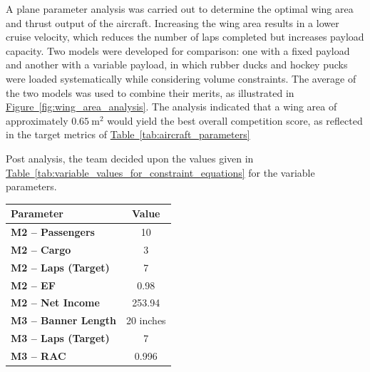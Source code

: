 \documentclass[10pt, letterpaper]{article}
\begin{document}
\noindent
\begin{minipage}{0.6\textwidth}
A plane parameter analysis was carried out to determine the optimal wing area and thrust
output of the aircraft. Increasing the wing area results in a lower cruise velocity, which
reduces the number of laps completed but increases payload capacity. Two models were
developed for comparison: one with a fixed payload and another with a variable payload,
in which rubber ducks and hockey pucks were loaded systematically while considering volume constraints.
The average of the two models was used to combine their merits, as illustrated in
\hyperref[fig:wing_area_analysis]{Figure~\ref*{fig:wing_area_analysis}}. The analysis indicated that a wing area of
approximately $0.65~\text{m}^2$ would yield the best overall competition score, as reflected in the target metrics of \hyperref[tab:aircraft_parameters]{Table~\ref*{tab:aircraft_parameters}}

\vspace{6pt}

Post analysis, the team decided upon the values given in \hyperref[tab:variable_values_for_constraint_equations]{Table~\ref*{tab:variable_values_for_constraint_equations}}
for the variable parameters.
\end{minipage}
\hfill
\begin{minipage}{0.36\textwidth} 
\centering 
\begin{tabular}{|>{\bfseries}l |c|}
\hline
\rowcolor{y}Parameter & Value \\ 
\hline
\cellcolor{db}\color{gray!5}M2 -- Passengers & 10 \\
\hline
\cellcolor{db}\color{gray!5}M2 -- Cargo & 3 \\ 
\hline
\cellcolor{db}\color{gray!5}M2 -- Laps (Target) & 7 \\ 
\hline
\cellcolor{db}\color{gray!5}M2 -- EF & 0.98 \\ 
\hline
\cellcolor{db}\color{gray!5}M2 -- Net Income & 253.94 \\
\hline
\cellcolor{db}\color{gray!5}M3 -- Banner Length & 20 inches \\ 
\hline
\cellcolor{db}\color{gray!5}M3 -- Laps (Target) & 7 \\
\hline
\cellcolor{db}\color{gray!5}M3 -- RAC & 0.996 \\
\hline
\end{tabular}

\label{tab:aircraft_parameters}

\end{minipage}
\end{document}
